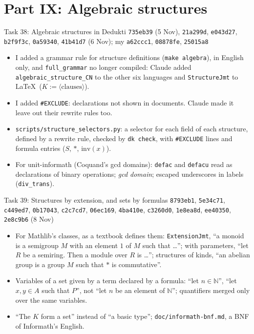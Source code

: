 \documentclass[10pt,aspectratio=169]{beamer}
\newcommand{\bad}[1]{\textcolor{warn}{#1}}
\newcommand{\ok}[1]{\textcolor{good}{#1}}
\newcommand{\commit}[1]{\texttt{\footnotesize #1}}
\begin{document}
\section{Part IX: Algebraic structures}

\begin{frame}{Task 38: Algebraic structures in Dedukti}
  \commit{735eb39} (5 Nov), \commit{21a299d}, \commit{e043d27}, \commit{b2f9f3c},
  \commit{0a59340}, \commit{41b41d7} (6 Nov); my \commit{a62ccc1}, \commit{08878fe},
  \commit{25015a8}
  \begin{itemize}\small
    \item I added a grammar rule for structure definitions (\texttt{make algebra}), in English
          only, and \texttt{full\_grammar} no longer compiled: Claude added
          \texttt{algebraic\_structure\_CN} to the other six languages and \texttt{StructureJmt}
          to \LaTeX\ ($K := \langle\text{clauses}\rangle$).
    \item I added \texttt{\#EXCLUDE}: declarations not shown in documents. Claude made it
          leave out their rewrite rules too.
    \item \texttt{scripts/structure\_selectors.py}: a selector for each field of each
          structure, defined by a rewrite rule, checked by \texttt{dk check}, with
          \texttt{\#EXCLUDE} lines and formula entries ($S$, $*$, $\mathrm{inv}(x)$).
    \item For unit-informath (Coquand's gcd domains): \texttt{defac} and \texttt{defacu} read as
          declarations of binary operations; \emph{gcd domain}; escaped underscores in labels
          (\texttt{div\_trans}).
  \end{itemize}
\end{frame}

\begin{frame}{Task 39: Structures by extension, and sets by formulas}
  \commit{8793eb1}, \commit{5e34c71}, \commit{c449ed7}, \commit{0b17043}, \commit{c2c7cd7},
  \commit{06ec169}, \commit{4ba410e}, \commit{c3260d0}, \commit{1e8ea8d}, \commit{ee40350},
  \commit{2e8c9b6} (8 Nov)
  \begin{itemize}\small
    \item For Mathlib's classes, as a textbook defines them: \texttt{ExtensionJmt},
          \ok{``a monoid is a semigroup $M$ with an element $1$ of $M$ such that \ldots''};
          with parameters, ``let $R$ be a semiring. Then a module over $R$ is \ldots'';
          structures of kinds, ``an abelian group is a group $M$ such that $*$ is
          commutative''.
    \item Variables of a set given by a term declared by a formula: \ok{``let $n \in
          \mathbb{N}$''}, ``let $x, y \in A$ such that $P$'', not ``let $n$ be an element of
          $\mathbb{N}$''; quantifiers merged only over the same variables.
    \item ``The $K$ form a set'' instead of \bad{``a basic type''};
          \texttt{doc/informath-bnf.md}, a BNF of Informath's English.
  \end{itemize}
\end{frame}
\end{document}
